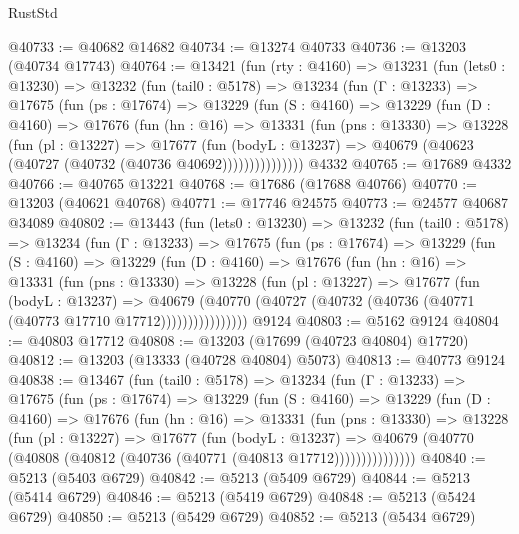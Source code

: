 \begin{lexlean}{RustStd}
\begin{coremodule}
@40733 := @40682 @14682
@40734 := @13274 @40733
@40736 := @13203 (@40734 @17743)
@40764 := @13421
    (fun (rty : @4160) =>
    @13231
      (fun (lets0 : @13230) =>
      @13232
        (fun (tail0 : @5178) =>
        @13234
          (fun (Γ : @13233) =>
          @17675
            (fun (ps : @17674) =>
            @13229
              (fun (S : @4160) =>
              @13229
                (fun (D : @4160) =>
                @17676
                  (fun (hn : @16) =>
                  @13331
                    (fun (pns : @13330) =>
                    @13228
                      (fun (pl : @13227) =>
                      @17677
                        (fun (bodyL : @13237) =>
                        @40679 (@40623 (@40727 (@40732 (@40736 @40692)))))))))))))))
    @4332
@40765 := @17689 @4332
@40766 := @40765 @13221
@40768 := @17686 (@17688 @40766)
@40770 := @13203 (@40621 @40768)
@40771 := @17746 @24575
@40773 := @24577 @40687 @34089
@40802 := @13443
    (fun (lets0 : @13230) =>
    @13232
      (fun (tail0 : @5178) =>
      @13234
        (fun (Γ : @13233) =>
        @17675
          (fun (ps : @17674) =>
          @13229
            (fun (S : @4160) =>
            @13229
              (fun (D : @4160) =>
              @17676
                (fun (hn : @16) =>
                @13331
                  (fun (pns : @13330) =>
                  @13228
                    (fun (pl : @13227) =>
                    @17677
                      (fun (bodyL : @13237) =>
                      @40679
                        (@40770
                          (@40727 (@40732 (@40736 (@40771 (@40773 @17710 @17712))))))))))))))))
    @9124
@40803 := @5162 @9124
@40804 := @40803 @17712
@40808 := @13203 (@17699 (@40723 @40804) @17720)
@40812 := @13203 (@13333 (@40728 @40804) @5073)
@40813 := @40773 @9124
@40838 := @13467
    (fun (tail0 : @5178) =>
    @13234
      (fun (Γ : @13233) =>
      @17675
        (fun (ps : @17674) =>
        @13229
          (fun (S : @4160) =>
          @13229
            (fun (D : @4160) =>
            @17676
              (fun (hn : @16) =>
              @13331
                (fun (pns : @13330) =>
                @13228
                  (fun (pl : @13227) =>
                  @17677
                    (fun (bodyL : @13237) =>
                    @40679 (@40770 (@40808 (@40812 (@40736 (@40771 (@40813 @17712)))))))))))))))
@40840 := @5213 (@5403 @6729)
@40842 := @5213 (@5409 @6729)
@40844 := @5213 (@5414 @6729)
@40846 := @5213 (@5419 @6729)
@40848 := @5213 (@5424 @6729)
@40850 := @5213 (@5429 @6729)
@40852 := @5213 (@5434 @6729)

\end{coremodule}
\end{lexlean}
